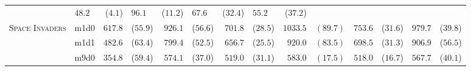\begin{tabular}{ll rl rl rl rl rl rl}
& $48.2$ & ($4.1$) %
& $96.1$ & ($11.2$) %

& $67.6$ & ($32.4$)
& $55.2$ & ($37.2$) \\ \cmidrule[0.2mm]{1-14}

\multirow{3}{*}{\textsc{Space Invaders}}

& m1d0
& $617.8$ & ($55.9$) %
& $926.1$ & ($56.6$) %

& $701.8$ & ($28.5$) %
& $1033.5$ & $(89.7)$ %

& $753.6$ & ($31.6$)
& $979.7$ & ($39.8$) \\ \cmidrule(l){2-14}

& m1d1
& $482.6$ & ($63.4$) %
& $799.4$ & ($52.5$) %

& $656.7$ & ($25.5$) %
& $920.0$ & $(83.5)$ %

& $698.5$ & ($31.3$)
& $906.9$ & ($56.5$) \\ \cmidrule(l){2-14}

& m9d0
& $354.8$ & ($59.4$) %
& $574.1$ & ($37.0$) %

& $519.0$ & ($31.1$) %
& $583.0$ & $(17.5)$ %

& $518.0$ & ($16.7$)
& $567.7$ & ($40.1$) \\
\end{tabular}